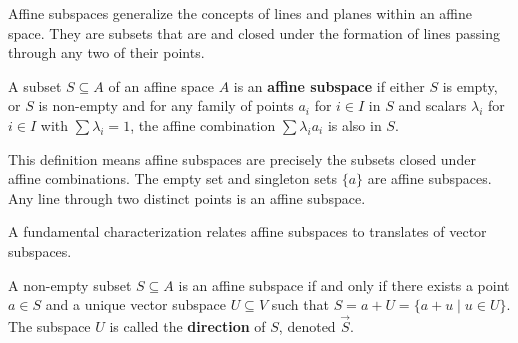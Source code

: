 Affine subspaces generalize the concepts of lines and planes within an affine space. They are subsets that are  and closed under the formation of lines passing through any two of their points.

\begin{definition}
A subset $S \subseteq A$ of an affine space $A$ is an \textbf{affine subspace} if either $S$ is empty, or $S$ is non-empty and for any family of points $a_i$ for $i \in I$ in $S$ and scalars $\lambda_i$ for $i \in I$ with $\sum \lambda_i = 1$, the affine combination $\sum \lambda_i a_i$ is also in $S$.
\end{definition}

This definition means affine subspaces are precisely the subsets closed under affine combinations. The empty set and singleton sets $\{a\}$ are affine subspaces. Any line through two distinct points is an affine subspace.

A fundamental characterization relates affine subspaces to translates of vector subspaces.

\begin{proposition}
A non-empty subset $S \subseteq A$ is an affine subspace if and only if there exists a point $a \in S$ and a unique vector subspace $U \subseteq V$ such that $S = a + U = \{ a + u \mid u \in U \}$. The subspace $U$ is called the \textbf{direction} of $S$, denoted $\vec{S}$.
\end{proposition}

